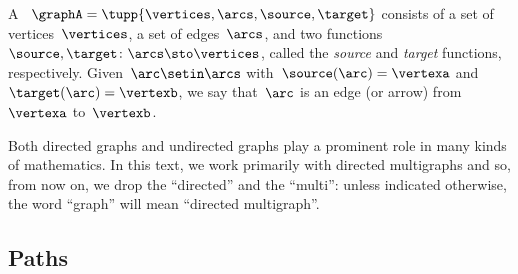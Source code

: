 \begin{ctdefinition}
    \label{def:Graph}
    A ~$\graphA=\tupp{\vertices,\arcs, \source,\target}$ consists of a set of vertices~$\vertices$, a set of edges~$\arcs$, and two functions~$\source,\target \colon \arcs \sto \vertices$, called the \emph{source} and \emph{target} functions, respectively.
    Given~$\arc\setin \arcs$ with~$\source(\arc)=\vertexa$ and~$\target(\arc)=\vertexb$, we say that~$\arc$ is an edge (or arrow) from~$\vertexa$ to~$\vertexb$.
\end{ctdefinition}


Both directed graphs and undirected graphs play a prominent role in many kinds of mathematics.
In this text, we work primarily with directed multigraphs and so, from now on, we drop the ``directed'' and the ``multi'': unless indicated otherwise, the word ``graph'' will mean ``directed multigraph''.



\subsection{Paths}

